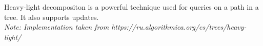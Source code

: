 Heavy-light decompositon is a powerful technique used for queries on a path in a tree. It also supports updates.
\\ 
\emph{Note: Implementation taken from https://ru.algorithmica.org/cs/trees/heavy-light/}


